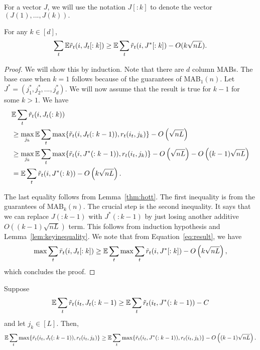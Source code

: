 For a vector $J$, we will use the notation $J[:k]$ to denote the vector $(J(1),...,J(k)).$
\begin{lemma}
\label{lem:keylem}
For any $k \in [d]$,
$$ \sum_t \mathbb{E} \tilde{r}_t(i, J_t[:k]) \geq  \mathbb{E} \sum_t \tilde{r}_t(i, J^*[:k]) - O(k\sqrt{nL}).$$ 
\end{lemma}
\begin{proof}
We will show this by induction. Note that there are $d$ column MABs. The base case when $k=1$ follows because of the guarantees of MAB$_1(n)$.
Let $J^* = (j_1^*,j_2^*,...,j_d^*).$   We will now assume that the result is true for $k-1$ for some $k>1.$
We have 
\begin{align}
& \mathbb{E}  \sum_t \tilde{r}_t(i, J_t(:k))   \\
&\geq \max_{j_k} \mathbb{E} \sum_t   \max \{ \tilde{r}_t(i, J_t(:k-1)), r_t(i_t,j_k) \}  - O\left(\sqrt{nL}\right) \\
&\geq \max_{j_k} \mathbb{E} \sum_t   \max \{  \tilde{r}_t(i, J^*(:k-1)), r_t(i_t,j_k) \}   - O\left( \sqrt{nL} \right) - O\left( (k-1)\sqrt{nL} \right)   \\
\label{eq:result}
& =  \mathbb{E} \sum_t  \tilde{r}_t(i, J^*(:k))  - O\left( k\sqrt{nL} \right).
\end{align}

The last equality follows from Lemma~\ref{thm:hott}.  
The first inequality is from the guarantees of MAB$_k(n)$.  The crucial step is  the second inequality. It says that we can replace $J(:k-1)$ with $J^*(:k-1)$ by just losing another additive $O\left( (k-1) \sqrt{nL} \right)$ term. This follows from induction hypothesis and Lemma~\ref{lem:keyinequality}. We note that from Equation~\ref{eq:result}, we have
$$ \max  \sum_t \tilde{r}_t(i, J_t[:k])  \geq  \mathbb{E} \sum_t \max  \sum_t \tilde{r}_t(i, J^*[:k])  - O\left( k \sqrt{nL} \right),$$
which concludes the proof.
\end{proof}


\begin{lemma}
\label{lem:keyinequality}
Suppose
 $$ \mathbb{E} \sum_t \tilde{r}_t(i_t, J_t(:k-1) \geq  \mathbb{E} \sum_t \tilde{r}_t(i_t, J^*(:k-1))  - C$$
  and let $j_k \in [L].$ Then,
$$ \mathbb{E} \sum_t \max \{ \tilde{r}_t(i_t, J_t(:k-1)), r_t(i_t,j_k) \} \geq \mathbb{E} \sum_t  \max \{ \tilde{r}_t(i_t, J^*(:k-1)), r_t(i_t,j_k) \} - O\left((k-1) \sqrt{nL} \right).$$
\end{lemma}

